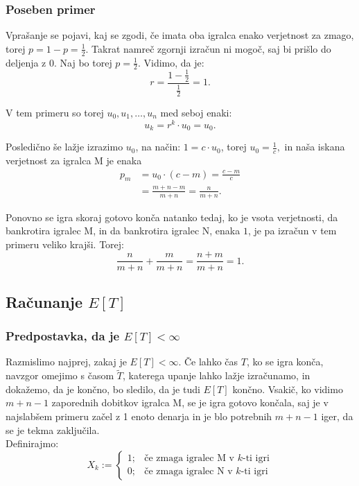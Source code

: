 \documentclass[12pt, a4paper]{article}
\begin{document}
\subsubsection{Poseben primer}
\label{Poseben primer za  r = 1}
Vprašanje se pojavi, kaj se zgodi, če imata oba igralca enako verjetnost za zmago, torej $p = 1 - p = \frac{1}{2}$. Takrat namreč zgornji izračun ni mogoč, saj bi prišlo do deljenja z $0$. Naj bo torej $p = \frac{1}{2}$. Vidimo, da je: 
$$r = \frac{1 - \frac{1}{2}}{\frac{1}{2}} = 1.$$

V tem primeru so torej $u_0, u_1, \dotso, u_n$ med seboj enaki:
$$u_k = r^k \cdot u_0 = u_0.$$

Posledično še lažje izrazimo $u_0$, na način:
$1 = c\cdot u_0$, torej $u_0 = \frac{1}{c},$
in naša iskana verjetnost za igralca M  je enaka
\begin{equation*}
\begin{split}
p_m &= u_0 \cdot (c - m) = \frac{c-m}{c}  \\
		&= \frac{m + n - m}{m + n} = \frac{n}{m + n}.
\end{split} 
\end{equation*}

Ponovno se igra skoraj gotovo konča natanko tedaj, ko je vsota verjetnosti, da bankrotira igralec M, in da bankrotira igralec N, enaka $1$, je pa izračun v tem primeru veliko krajši. Torej: 
$$\frac{n}{m + n} + \frac{m}{m + n} = \frac{n + m}{m+ n} = 1.$$


\subsection{Računanje $E[T]$}
\subsubsection{Predpostavka, da je $E[T] < \infty$}
Razmislimo najprej, zakaj je $E[T] <\infty$. Če lahko čas $T$, ko se igra konča, navzgor omejimo s časom $\widetilde{T}$, katerega upanje lahko lažje izračunamo, in dokažemo, da je končno, bo sledilo, da je tudi $E[T]$ končno. Vsakič, ko vidimo $m+n-1$ zaporednih dobitkov igralca M, se je igra gotovo končala, saj je v najslabšem primeru začel z 1 enoto denarja in je blo potrebnih $m+n-1$ iger, da se je tekma zaključila.\\

Definirajmo: 
\[
X_k := \left\{
\begin{array}{rl}
1; & \textrm{če zmaga igralec M v }k\textrm{-ti igri}\\
0; & \textrm{če zmaga igralec N v }k\textrm{-ti igri}
\end{array}
\right.
\]
\end{document}

